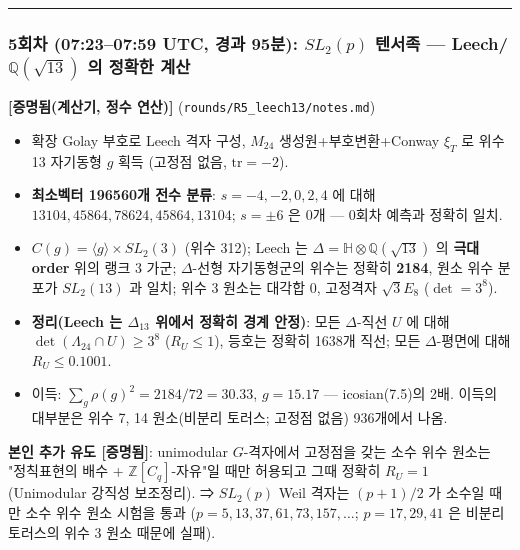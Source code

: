 \begin{center}\rule{0.5\linewidth}{0.5pt}\end{center}

\hypertarget{uxd68cuxcc28-07230759-utc-uxacbduxacfc-95uxbd84-sl_2p-uxd150uxc11cuxc871-leechmathbb-qsqrt13-uxc758-uxc815uxd655uxd55c-uxacc4uxc0b0}{%
\subsubsection*{\texorpdfstring{5회차 (07:23--07:59 UTC, 경과 95분): \(SL_2(p)\) 텐서족 --- Leech/\(\mathbb Q(\sqrt{13})\) 의 정확한 계산}{5회차 (07:23--07:59 UTC, 경과 95분): SL\_2(p) 텐서족 --- Leech/\textbackslash mathbb Q(\textbackslash sqrt\{13\}) 의 정확한 계산}}\label{uxd68cuxcc28-07230759-utc-uxacbduxacfc-95uxbd84-sl_2p-uxd150uxc11cuxc871-leechmathbb-qsqrt13-uxc758-uxc815uxd655uxd55c-uxacc4uxc0b0}}

\textbf{{[}증명됨(계산기, 정수 연산){]}} (\texttt{rounds/R5\_leech13/notes.md})

\begin{itemize}
\tightlist
\item
  확장 Golay 부호로 Leech 격자 구성, \(M_{24}\) 생성원+부호변환+Conway \(\xi_T\) 로 위수 13 자기동형 \(g\) 획득 (고정점 없음, \(\mathrm{tr}=-2\)).
\item
  \textbf{최소벡터 196560개 전수 분류}: \(s=-4,-2,0,2,4\) 에 대해 \(13104,45864,78624,45864,13104\); \(s=\pm6\) 은 0개 --- 0회차 예측과 정확히 일치.
\item
  \(C(g)=\langle g\rangle\times SL_2(3)\) (위수 312); Leech 는 \(\Delta=\mathbb H\otimes\mathbb Q(\sqrt{13})\) 의 \textbf{극대 order} 위의 랭크 3 가군; \(\Delta\)-선형 자기동형군의 위수는 정확히 \textbf{2184}, 원소 위수 분포가 \(SL_2(13)\) 과 일치; 위수 3 원소는 대각합 0, 고정격자 \(\sqrt3E_8\) (\(\det=3^8\)).
\item
  \textbf{정리(Leech 는 \(\Delta_{13}\) 위에서 정확히 경계 안정)}: 모든 \(\Delta\)-직선 \(U\) 에 대해 \(\det(\Lambda_{24}\cap U)\ge3^8\) (\(R_U\le1\)), 등호는 정확히 1638개 직선; 모든 \(\Delta\)-평면에 대해 \(R_U\le0.1001\).
\item
  이득: \(\sum_g\rho(g)^2=2184/72=30.33\), \(g=15.17\) --- icosian(7.5)의 2배. 이득의 대부분은 위수 7, 14 원소(비분리 토러스; 고정점 없음) 936개에서 나옴.
\end{itemize}

\textbf{본인 추가 유도 {[}증명됨{]}}: unimodular \(G\)-격자에서 고정점을 갖는 소수 위수 원소는 "정칙표현의 배수 + \(\mathbb Z[C_q]\)-자유"일 때만 허용되고 그때 정확히 \(R_U=1\) (Unimodular 강직성 보조정리). ⇒ \(SL_2(p)\) Weil 격자는 \((p+1)/2\) 가 소수일 때만 소수 위수 원소 시험을 통과 (\(p=5,13,37,61,73,157,\dots\); \(p=17,29,41\) 은 비분리 토러스의 위수 3 원소 때문에 실패).

